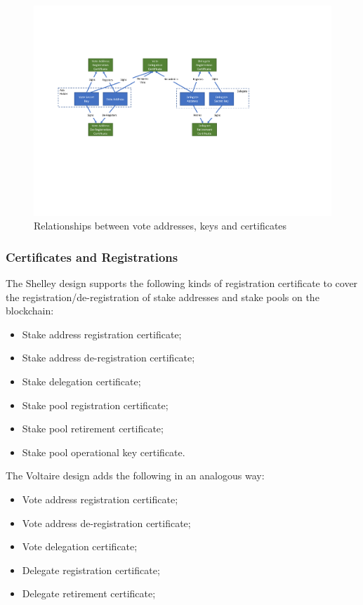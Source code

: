 \begin{figure}[h]
  \begin{center}
  \includegraphics[trim=10 150 30 80,clip,width=\textwidth]{Relationships}
  \end{center}
  \caption{Relationships between vote addresses, keys and certificates}
  \label{fig:relationships}
\end{figure}

\subsubsection*{Certificates and Registrations}

The Shelley design supports the following kinds of registration certificate to cover the registration/de-registration of stake addresses and stake pools on the blockchain:

\begin{itemize}
\item
Stake address registration certificate;
\item
Stake address de-registration certificate;
\item
Stake delegation certificate;
\item
Stake pool registration certificate;
\item
Stake pool retirement certificate;
\item
Stake pool operational key certificate.
\end{itemize}

The Voltaire design adds the following in an analogous way:

\begin{itemize}
\item
Vote address registration certificate;
\item
Vote address de-registration certificate;
\item
Vote delegation certificate;
\item
Delegate registration certificate;
\item
Delegate retirement certificate;
\end{itemize}



